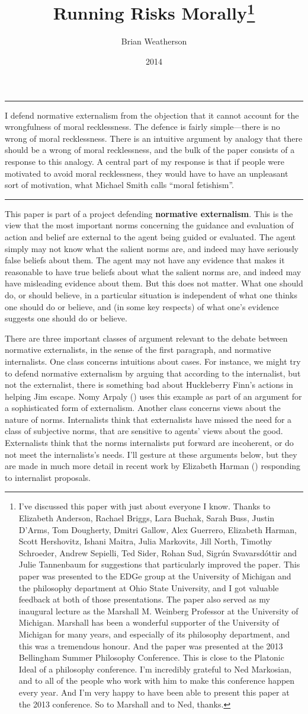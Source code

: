 \documentclass[
  10pt,
  letterpaper,
  DIV=11,
  numbers=noendperiod,
  twoside]{scrartcl}
\title{Running Risks Morally\thanks{I've discussed this paper with just
about everyone I know. Thanks to Elizabeth Anderson, Rachael Briggs,
Lara Buchak, Sarah Buss, Justin D'Arms, Tom Dougherty, Dmitri Gallow,
Alex Guerrero, Elizabeth Harman, Scott Hershovitz, Ishani Maitra, Julia
Markovits, Jill North, Timothy Schroeder, Andrew Sepielli, Ted Sider,
Rohan Sud, Sigrún Svavarsdóttir and Julie Tannenbaum for suggestions
that particularly improved the paper. This paper was presented to the
EDGe group at the University of Michigan and the philosophy department
at Ohio State University, and I got valuable feedback at both of those
presentations. The paper also served as my inaugural lecture as the
Marshall M. Weinberg Professor at the University of Michigan. Marshall
has been a wonderful supporter of the University of Michigan for many
years, and especially of its philosophy department, and this was a
tremendous honour. And the paper was presented at the 2013 Bellingham
Summer Philosophy Conference. This is close to the Platonic Ideal of a
philosophy conference. I'm incredibly grateful to Ned Markosian, and to
all of the people who work with him to make this conference happen every
year. And I'm very happy to have been able to present this paper at the
2013 conference. So to Marshall and to Ned, thanks.}}
\author{Brian Weatherson}
\date{2014}
\renewenvironment{abstract}
 {\vspace{-1.25cm}
 \quotation\small\noindent\rule{\linewidth}{.5pt}\par\smallskip
 \noindent }
 {\par\noindent\rule{\linewidth}{.5pt}\endquotation}
\begin{document}
\maketitle
\begin{abstract}
I defend normative externalism from the objection that it cannot account
for the wrongfulness of moral recklessness. The defence is fairly
simple---there is no wrong of moral recklessness. There is an intuitive
argument by analogy that there should be a wrong of moral recklessness,
and the bulk of the paper consists of a response to this analogy. A
central part of my response is that if people were motivated to avoid
moral recklessness, they would have to have an unpleasant sort of
motivation, what Michael Smith calls ``moral fetishism''.
\end{abstract}

This paper is part of a project defending \textbf{normative
externalism}. This is the view that the most important norms concerning
the guidance and evaluation of action and belief are external to the
agent being guided or evaluated. The agent simply may not know what the
salient norms are, and indeed may have seriously false beliefs about
them. The agent may not have any evidence that makes it reasonable to
have true beliefs about what the salient norms are, and indeed may have
misleading evidence about them. But this does not matter. What one
should do, or should believe, in a particular situation is independent
of what one thinks one should do or believe, and (in some key respects)
of what one's evidence suggests one should do or believe.

There are three important classes of argument relevant to the debate
between normative externalists, in the sense of the first paragraph, and
normative internalists. One class concerns intuitions about cases. For
instance, we might try to defend normative externalism by arguing that
according to the internalist, but not the externalist, there is
something bad about Huckleberry Finn's actions in helping Jim escape.
Nomy Arpaly () uses this example as part
of an argument for a sophisticated form of externalism. Another class
concerns views about the nature of norms. Internalists think that
externalists have missed the need for a class of subjective norms, that
are sensitive to agents' views about the good. Externalists think that
the norms internalists put forward are incoherent, or do not meet the
internalists's needs. I'll gesture at these arguments below, but they
are made in much more detail in recent work by Elizabeth Harman
() responding to internalist proposals.
\end{document}
